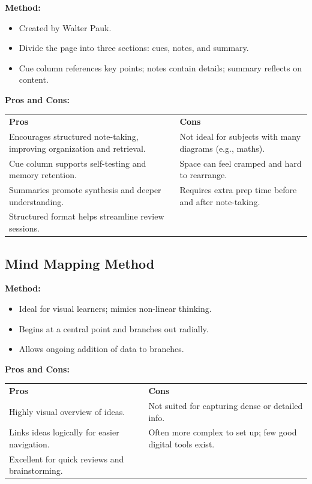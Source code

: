 \textbf{Method:}
\begin{itemize}
    \item Created by Walter Pauk.
    \item Divide the page into three sections: cues, notes, and summary.
    \item Cue column references key points; notes contain details; summary reflects on content.
\end{itemize}

\textbf{Pros and Cons:}

\begin{tabularx}{\textwidth}{>{\raggedright\arraybackslash}X>{\raggedright\arraybackslash}X}
    \rowcolor{gray!15} \textbf{Pros}                                         & \textbf{Cons}                                            \\
    Encourages structured note-taking, improving organization and retrieval. & Not ideal for subjects with many diagrams (e.g., maths). \\
    Cue column supports self-testing and memory retention.                   & Space can feel cramped and hard to rearrange.            \\
    Summaries promote synthesis and deeper understanding.                    & Requires extra prep time before and after note-taking.   \\
    Structured format helps streamline review sessions.                      &                                                          \\
\end{tabularx}

\vspace{1em}
\subsection*{Mind Mapping Method}

\textbf{Method:}
\begin{itemize}
    \item Ideal for visual learners; mimics non-linear thinking.
    \item Begins at a central point and branches out radially.
    \item Allows ongoing addition of data to branches.
\end{itemize}

\textbf{Pros and Cons:}

\begin{tabularx}{\textwidth}{>{\raggedright\arraybackslash}X>{\raggedright\arraybackslash}X}
    \rowcolor{gray!15} \textbf{Pros}               & \textbf{Cons}                                               \\
    Highly visual overview of ideas.               & Not suited for capturing dense or detailed info.            \\
    Links ideas logically for easier navigation.   & Often more complex to set up; few good digital tools exist. \\
    Excellent for quick reviews and brainstorming. &                                                             \\
\end{tabularx}

